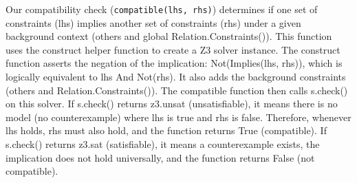 Our compatibility check (\texttt{compatible(lhs, rhs)}) determines if
one set of constraints (lhs) implies another set of constraints (rhs)
under a given background context (others and global
Relation.Constraints()). This function uses the construct helper
function to create a Z3 solver instance. The construct function
asserts the negation of the implication: Not(Implies(lhs, rhs)),
which is logically equivalent to lhs And Not(rhs). It also adds the
background constraints (others and Relation.Constraints()). The
compatible function then calls s.check() on this solver. If s.check()
returns z3.unsat (unsatisfiable), it means there is no model (no
counterexample) where lhs is true and rhs is false. Therefore,
whenever lhs holds, rhs must also hold, and the function returns True
(compatible). If s.check() returns z3.sat (satisfiable), it means a
counterexample exists, the implication does not hold universally, and
the function returns False (not compatible).

